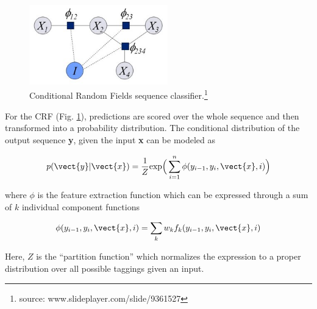 
\begin{figure}
    \centering
    \includegraphics[width=6cm]{figs/CRF.jpg}
    \caption[Conditional Random Fields]{Conditional Random Fields sequence classifier.\footnote{source: www.slideplayer.com/slide/9361527}}
    \label{fig:CRF}
\end{figure}

For the CRF (Fig. \ref{fig:CRF}), predictions are scored over the whole sequence and then transformed into a probability distribution. The conditional distribution of the output sequence {\bf y}, given the input {\bf x} can be modeled as

\begin{equation}
p(\vect{y}|\vect{x}) = \frac{1}{Z} \textrm{exp}\Big(\sum_{i=1}^n\phi(y_{i-1}, y_i,\vect{x},i)\Big)
\end{equation}

\noindent where $\phi$ is the feature extraction function which can be expressed through a sum of $k$ individual component functions

\begin{equation}
\phi(y_{i-1}, y_i,\vect{x},i) = \sum_k w_k f_k(y_{i-1}, y_i,\vect{x},i)
\end{equation}

\noindent Here, $Z$ is the ``partition function'' which normalizes the expression to a proper distribution over all possible taggings given an input. 


